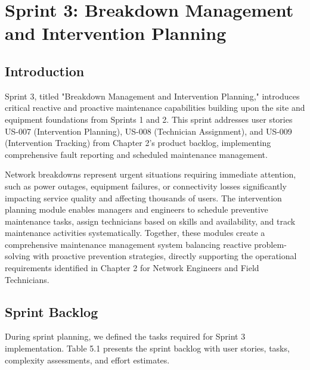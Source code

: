 \newpage

\chapter{Sprint 3: Breakdown Management and Intervention Planning}

\cfoot{\thepage}

\parindent=0.5in
\onehalfspacing

\section{Introduction}

Sprint 3, titled "Breakdown Management and Intervention Planning," introduces critical reactive and proactive maintenance capabilities building upon the site and equipment foundations from Sprints 1 and 2. This sprint addresses user stories US-007 (Intervention Planning), US-008 (Technician Assignment), and US-009 (Intervention Tracking) from Chapter 2's product backlog, implementing comprehensive fault reporting and scheduled maintenance management.

Network breakdowns represent urgent situations requiring immediate attention, such as power outages, equipment failures, or connectivity losses significantly impacting service quality and affecting thousands of users. The intervention planning module enables managers and engineers to schedule preventive maintenance tasks, assign technicians based on skills and availability, and track maintenance activities systematically. Together, these modules create a comprehensive maintenance management system balancing reactive problem-solving with proactive prevention strategies, directly supporting the operational requirements identified in Chapter 2 for Network Engineers and Field Technicians.

\section{Sprint Backlog}

During sprint planning, we defined the tasks required for Sprint 3 implementation. Table 5.1 presents the sprint backlog with user stories, tasks, complexity assessments, and effort estimates.

